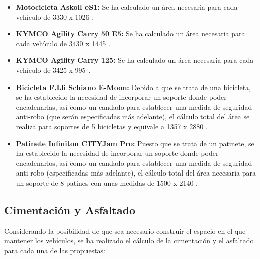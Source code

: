 \begin{itemize}
    \item \textbf{Motocicleta Askoll eS1:} Se ha calculado un área necesaria para cada vehículo de 3330 x 1026 . 
    \item \textbf{KYMCO Agility Carry 50 E5:} Se ha calculado un área necesaria para cada vehículo de 3430 x 1445 . 
    \item \textbf{KYMCO Agility Carry 125:} Se ha calculado un área necesaria para cada vehículo de 3425 x 995 . 
    \item \textbf{Bicicleta F.Lli Schiano E-Moon:} Debido a que se trata de una bicicleta, se ha establecido la necesidad de incorporar un soporte donde poder encadenarlas, así como un candado para establecer una medida de seguridad anti-robo (que serán especificadas más adelante), el cálculo total del área se realiza para soportes de 5 bicicletas y equivale a 1357 x 2880 . 
    \item \textbf{Patinete Infiniton CITYJam Pro:} Puesto que se trata de un patinete, se ha establecido la necesidad de incorporar un soporte donde poder encadenarlos, así como un candado para establecer una medida de seguridad anti-robo (especificadas más adelante), el cálculo total del área necesaria para un soporte de 8 patines con unas medidas de 1500 x 2140 . 
 \end{itemize}

\subsection{Cimentación y Asfaltado}
Considerando la posibilidad de que sea necesario construir el espacio en el que mantener los vehículos, se ha realizado el cálculo de la cimentación y el asfaltado para cada una de las propuestas:

